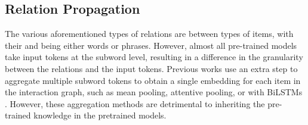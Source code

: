 \documentclass[11pt]{article}
\begin{document}
\begin{table*}[t]
\centering
{}
\caption{Results on SParC dataset. Models in the upper block do not predict SQL values, while the ones in the middle block do.}
\label{tab:sparc_dev_res}
\end{table*}



\subsection{Relation Propagation}    \label{relation_propagation}
The various aforementioned types of relations are between types of items, with their  and  being either words or phrases. However, almost all pre-trained models take input tokens at the subword level, resulting in a difference in the granularity between the relations and the input tokens. Previous works use an extra step to aggregate multiple subword tokens to obtain a single embedding for each item in the interaction graph, such as mean pooling, attentive pooling, or with BiLSTMs \citep{wang-etal-2020-rat,cao-etal-2021-lgesql}. However, these aggregation methods are detrimental to inheriting the pre-trained knowledge in the pretrained models.
\end{document}
